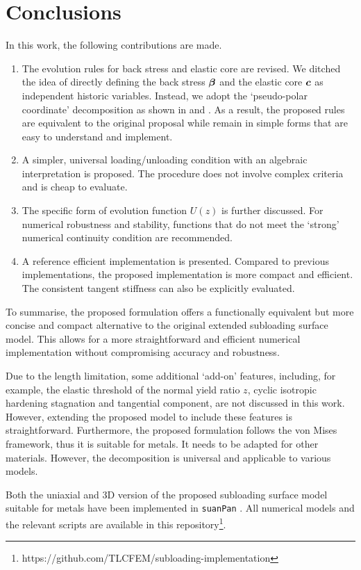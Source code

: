 \section{Conclusions}
In this work, the following contributions are made.
\begin{enumerate}
    \item The evolution rules for back stress and elastic core are revised.
    We ditched the idea of directly defining the back stress $\bm{\beta}$ and the elastic core $\bm{c}$ as independent historic variables.
    Instead, we adopt the `pseudo-polar coordinate' decomposition as shown in  and .
    As a result, the proposed rules are equivalent to the original proposal while remain in simple forms that are easy to understand and implement.
    \item A simpler, universal loading/unloading condition with an algebraic interpretation is proposed.
    The procedure does not involve complex criteria and is cheap to evaluate.
    \item The specific form of evolution function $U\left(z\right)$ is further discussed.
          For numerical robustness and stability, functions that do not meet the `strong' numerical continuity condition are recommended.
    \item A reference efficient implementation is presented.
    Compared to previous implementations, the proposed implementation is more compact and efficient.
    The consistent tangent stiffness can also be explicitly evaluated.
\end{enumerate}
To summarise, the proposed formulation offers a functionally equivalent but more concise and compact alternative to the original extended subloading surface model.
This allows for a more straightforward and efficient numerical implementation without compromising accuracy and robustness.

Due to the length limitation, some additional `add-on' features, including, for example, the elastic threshold of the normal yield ratio $z$, cyclic isotropic hardening stagnation and tangential component, are not discussed in this work.
However, extending the proposed model to include these features is straightforward.
Furthermore, the proposed formulation follows the von Mises framework, thus it is suitable for metals.
It needs to be adapted for other materials.
However, the decomposition  is universal and applicable to various models.

Both the uniaxial and 3D version of the proposed subloading surface model suitable for metals have been implemented in \texttt{suanPan} \citep{Chang2024}.
All numerical models and the relevant scripts are available in this repository\footnote{https://github.com/TLCFEM/subloading-implementation}.